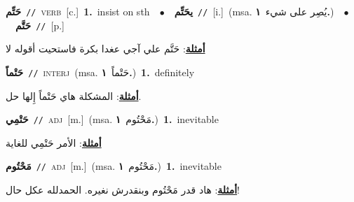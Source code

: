 \documentclass[10pt,a4paper,twoside]{article} %
\begin{document}
\begin{multicols}{2}
{{{{{{{{{{\setlength\topsep{0pt}\textbf{\foreignlanguage{arabic}{حَتِّم}}\ {\color{gray}\texttt{//}\color{black}}\ \textsc{verb}\ [c.]\ \textbf{1.}~insist on sth\ \ $\bullet$\ \ \setlength\topsep{0pt}\textbf{\foreignlanguage{arabic}{يحَتِّم}}\ {\color{gray}\texttt{//}\color{black}}\ [i.]\ \color{gray}(msa. \foreignlanguage{arabic}{يُصِر على شيء}~\foreignlanguage{arabic}{\textbf{١.}})\color{black}\ \ $\bullet$\ \ \setlength\topsep{0pt}\textbf{\foreignlanguage{arabic}{حَتَّم}}\ {\color{gray}\texttt{//}\color{black}}\ [p.]\  \begin{flushright}\color{gray}\foreignlanguage{arabic}{\textbf{\underline{\foreignlanguage{arabic}{أمثلة}}}: حَتَّم علي آجي عغدا بكرة فاستحيت أقوله لا}\end{flushright}\color{black}} \vspace{2mm}

{\setlength\topsep{0pt}\textbf{\foreignlanguage{arabic}{حَتْماً}}\ {\color{gray}\texttt{//}\color{black}}\ \textsc{interj}\ \color{gray}(msa. \foreignlanguage{arabic}{حَتْماً}~\foreignlanguage{arabic}{\textbf{١.}})\color{black}\ \textbf{1.}~definitely\  \begin{flushright}\color{gray}\foreignlanguage{arabic}{\textbf{\underline{\foreignlanguage{arabic}{أمثلة}}}: المشكلة هاي حَتْماً إِلها حل.}\end{flushright}\color{black}} \vspace{2mm}

{\setlength\topsep{0pt}\textbf{\foreignlanguage{arabic}{حَتْمِي}}\ {\color{gray}\texttt{//}\color{black}}\ \textsc{adj}\ [m.]\ \color{gray}(msa. \foreignlanguage{arabic}{مَحْتُوم}~\foreignlanguage{arabic}{\textbf{١.}})\color{black}\ \textbf{1.}~inevitable\  \begin{flushright}\color{gray}\foreignlanguage{arabic}{\textbf{\underline{\foreignlanguage{arabic}{أمثلة}}}: الأمر حَتْمِي للغاية}\end{flushright}\color{black}} \vspace{2mm}

{\setlength\topsep{0pt}\textbf{\foreignlanguage{arabic}{مَحْتُوم}}\ {\color{gray}\texttt{//}\color{black}}\ \textsc{adj}\ [m.]\ \color{gray}(msa. \foreignlanguage{arabic}{مَحْتُوم}~\foreignlanguage{arabic}{\textbf{١.}})\color{black}\ \textbf{1.}~inevitable\  \begin{flushright}\color{gray}\foreignlanguage{arabic}{\textbf{\underline{\foreignlanguage{arabic}{أمثلة}}}: هاد قدر مَحْتُوم وبنقدرش نغيره. الحمدلله عكل حال!}\end{flushright}\color{black}} \vspace{2mm}

}}}}}}}}}
\end{multicols}
\end{document}
